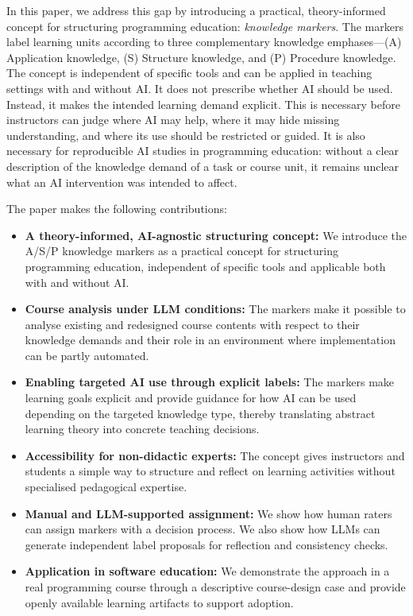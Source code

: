 \documentclass{article}
\begin{document}
In this paper, we address this gap by introducing a practical, theory-informed concept for structuring programming education: \emph{knowledge markers}. The markers label learning units according to three complementary knowledge emphases—(A) Application knowledge, (S) Structure knowledge, and (P) Procedure knowledge. The concept is independent of specific tools and can be applied in teaching settings with and without AI. 
It does not prescribe whether AI should be used. Instead, it makes the intended learning demand explicit. This is necessary before instructors can judge where AI may help, where it may hide missing understanding, and where its use should be restricted or guided. It is also necessary for reproducible AI studies in programming education: without a clear description of the knowledge demand of a task or course unit, it remains unclear what an AI intervention was intended to affect.


The paper makes the following contributions:
\begin{itemize}[leftmargin=*]
\item \textbf{A theory-informed, AI-agnostic structuring concept:}
We introduce the A/S/P knowledge markers as a practical concept for structuring programming education, independent of specific tools and applicable both with and without AI.
\item \textbf{Course analysis under LLM conditions:}
The markers make it possible to analyse existing and redesigned course contents with respect to their knowledge demands and their role in an environment where implementation can be partly automated.
\item \textbf{Enabling targeted AI use through explicit labels:}
The markers make learning goals explicit and provide guidance for how AI can be used depending on the targeted knowledge type, thereby translating abstract learning theory into concrete teaching decisions.
\item \textbf{Accessibility for non-didactic experts:}
The concept gives instructors and students a simple way to structure and reflect on learning activities without specialised pedagogical expertise.
\item \textbf{Manual and LLM-supported assignment:}
We show how human raters can assign markers with a decision process. We also show how LLMs can generate independent label proposals for reflection and consistency checks.
\item \textbf{Application in software education:}
We demonstrate the approach in a real programming course through a descriptive course-design case and provide openly available learning artifacts to support adoption.
\end{itemize}
\end{document}

